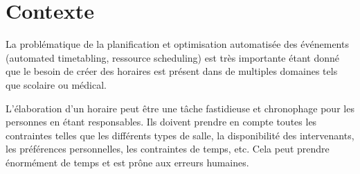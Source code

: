 \section{Contexte}
La problématique de la planification et optimisation automatisée des événements (automated timetabling, ressource scheduling) est très importante étant donné que le besoin de créer des horaires est présent dans de multiples domaines tels que scolaire ou médical.

L'élaboration d'un horaire peut être une tâche fastidieuse et chronophage pour les personnes en étant responsables. Ils doivent prendre en compte toutes les contraintes telles que les différents types de salle, la disponibilité des intervenants, les préférences personnelles, les contraintes de temps, etc. Cela peut prendre énormément de temps et est prône aux erreurs humaines.